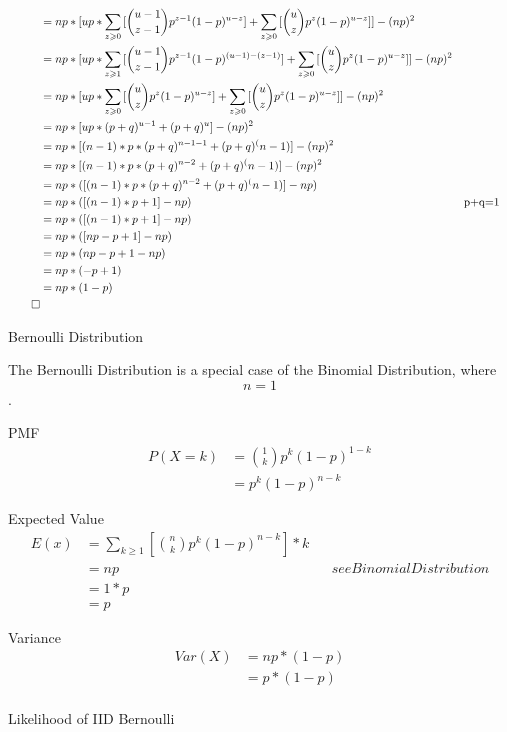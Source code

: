 \documentclass[]{article}
\begin{document}
\begin{align}
&= np*[up*\sum_{z \geqslant 0} {[\binom{u-1} {z-1} p^{z-1} (1-p)^{u-z}]} + \sum_{z \geqslant 0} {[\binom{u} {z} p^{z} (1-p)^{u-z}]}] - (np)^2\\
&= np*[up*\sum_{z \geqslant 1} {[\binom{u-1} {z-1} p^{z-1} (1-p)^{(u-1)-(z-1)}]} + \sum_{z \geqslant 0} {[\binom{u} {z} p^{z} (1-p)^{u-z}]}] - (np)^2\\
&= np*[up*\sum_{z \geqslant 0} {[\binom{u} {z} p^{z} (1-p)^{u-z}]} + \sum_{z \geqslant 0} {[\binom{u} {z} p^{z} (1-p)^{u-z}]}] - (np)^2\\
&= np*[up*(p+q)^{u-1} + (p+q)^u] - (np)^2\\
&= np*[(n-1)*p*(p+q)^{n-1-1}+(p+q)^(n-1)] -(np)^2\\
&= np*[(n-1)*p*(p+q)^{n-2}+(p+q)^(n-1)] - (np)^2\\
&= np*([(n-1)*p*(p+q)^{n-2}+(p+q)^(n-1)] - np)\\
&= np*([(n-1)*p+1] - np) && \text{p+q=1}\\
&= np*([(n-1)*p+1] - np)\\
&= np*([np-p +1] - np)\\
&= np*(np-p +1- np)\\
&= np*(-p +1)\\
&= np*(1-p)\\
\qed
\end{align}

Bernoulli Distribution

The Bernoulli Distribution is a special case of the Binomial Distribution, where $$n=1$$.

PMF
\begin{align}
P(X=k) &= \binom{1} {k} p^k (1-p)^{1-k}\\
&=p^k (1-p)^{n-k}
\end{align}

Expected Value
\begin{align}
	E(x) &= \sum_{k \geqslant 1} [\binom{n}{k} p^k (1-p)^{n-k}] * k\\
	&= np && see BinomialDistribution\\
	&= 1*p\\
	&= p
\end{align}

Variance
\begin{align}
	Var(X) &= np*(1-p)\\
	&= p*(1-p)\\
\end{align}

Likelihood of IID Bernoulli
\end{document}
